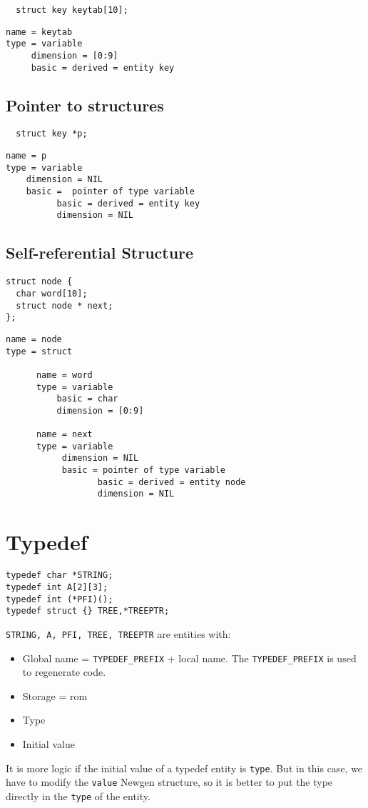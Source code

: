 \documentclass[a4paper]{report}
\begin{document}
\begin{lstlisting}
  struct key keytab[10];
\end{lstlisting}

\begin{verbatim}
name = keytab
type = variable
     dimension = [0:9]
     basic = derived = entity key
\end{verbatim}

\subsection{Pointer to structures}

\begin{lstlisting}
  struct key *p;
\end{lstlisting}

\begin{verbatim}
name = p
type = variable
    dimension = NIL
    basic =  pointer of type variable
          basic = derived = entity key
          dimension = NIL
\end{verbatim}

\subsection{Self-referential Structure}

\begin{lstlisting}
struct node {
  char word[10];
  struct node * next;
};
\end{lstlisting}

\begin{verbatim}
name = node
type = struct 

      name = word
      type = variable
          basic = char
          dimension = [0:9] 

      name = next
      type = variable
           dimension = NIL
           basic = pointer of type variable
                  basic = derived = entity node
                  dimension = NIL
\end{verbatim}

\section{Typedef}

\begin{lstlisting}
typedef char *STRING;
typedef int A[2][3];
typedef int (*PFI)();
typedef struct {} TREE,*TREEPTR;
\end{lstlisting}
\verb/STRING, A, PFI, TREE, TREEPTR/ are entities with:
\begin{itemize}
\item Global name = \verb/TYPEDEF_PREFIX/ + local name. The \verb/TYPEDEF_PREFIX/ is
  used to regenerate code. 
\item Storage = rom 
\item Type 
\item Initial value
\end{itemize}
It is more logic if the initial value of a typedef entity is
\verb/type/. But in this case, we have to modify the \verb/value/ Newgen
structure, so it is better to put the type directly in the \verb/type/ of
the entity.
\end{document}
